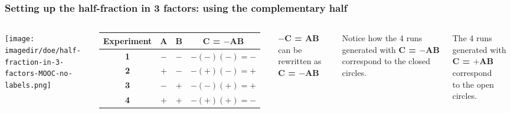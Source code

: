 \documentclass[handout,11pt,aspectratio=169,mathserif]{beamer}
\begin{document}
\begin{frame}\frametitle{Setting up the half-fraction in 3 factors: using the complementary half}
	\begin{columns}
			\begin{center}
				\texttt{[image: \\imagedir/doe/half-fraction-in-3-factors-MOOC-no-labels.png]}
			\end{center}
			
			\begin{tabulary}{\linewidth}{|c||c|c|c|}\hline 
				\textsf{\relax Experiment } & \textbf{\relax A } & \textbf{\relax B } & \textbf{\relax C = $-$AB } \\
				\hline \textbf{1} & \(-\) & \(-\) & \(-(-)(-) = -\) \\
				\hline \textbf{2} & \(+\) & \(-\) & \(-(+)(-) = +\) \\
				\hline \textbf{3} & \(-\) & \(+\) & \(-(-)(+) = +\) \\
				\hline \textbf{4} & \(+\) & \(+\) & \(-(+)(+) = -\) \\
				\hline
			\end{tabulary}
			
			\small
			\vspace{1cm}
			\textbf{\relax $-$C = AB} can be rewritten as \textbf{\relax C = $-$AB}
			
			\vspace{1cm}
			Notice how the 4 runs generated with \textbf{\relax C = $-$AB} correspond to the closed circles.

			\pause
			\vspace{1cm}
			The 4 runs generated with \textbf{\relax C = $+$AB} correspond\\
			to the open circles.
			
	\end{columns}
\end{frame}
\end{document}
